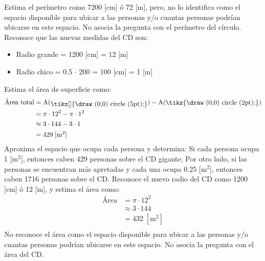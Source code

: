 \documentclass{cdplf-pauta}
\begin{document}
\begin{multicols}{3}
Estima el perímetro como 7200 [cm] ó 72 [m], pero, no lo identifica 
como el espacio disponible para ubicar a las personas y/o cuantas
personas podrían ubicarse en este espacio.
\insuficiente
[0 puntos] No asocia la pregunta con el perímetro del círculo.
\pregunta
\destacado
[4-5 puntos] Reconoce que las nuevas medidas del CD son:
\begin{itemize}[nosep,label=\textbullet]
    \item Radio grande = 1200 [cm] = 12 [m]
    \item Radio chico = 0.5 $\cdot$ 200 = 100 [cm] = 1 [m]
\end{itemize}
Estima el área de superficie como:
\setlength{\belowdisplayskip}{0pt}
\setlength{\belowdisplayshortskip}{0pt}
\begin{align*}
    \textrm{Área total} &= \mathrm{A}(\raisebox{-2.5pt}{\tikz[]{\draw (0,0) circle (5pt);}}) - \mathrm{A}(\raisebox{-0.5pt}{\tikz{\draw (0,0) circle (2pt);}}) \\
                        &= \pi\cdot 12^2 - \pi\cdot 1^2 \\
                        &\approx 3\cdot 144 - 3\cdot 1 \\
                        &= 429 \; [\textrm{m}^2] \\
\end{align*}
Aproxima el espacio que ocupa cada persona y determina: Si cada persona ocupa 1 [$\textrm{m}^2$], entonces caben 
429 personas sobre el CD gigante; Por otro lado, si las personas se encuentran más apretadas y cada una ocupa
0.25 [$\textrm{m}^2$], entonces caben 1716 personas sobre el CD.
\competente
[1-3 puntos] Reconoce el nuevo radio del CD como 1200 [cm] ó 12 [m], y 
estima el área como:
\setlength{\belowdisplayskip}{0pt}
\setlength{\belowdisplayshortskip}{0pt}
\begin{align*}
    \textrm{Área}       &=  \pi\cdot 12^2\\
                        &\approx 3\cdot 144\\
                        &= 432 \; [\textrm{m}^2] \\
\end{align*}
No reconoce el área como el espacio disponible para ubicar 
a las personas y/o cuantas personas podrían ubicarse en este 
espacio.
\insuficiente
[0 puntos] No asocia la pregunta con el área del CD.

\end{multicols}

\Large\vspace*{2cm}\hspace*{\fill}
\Caja[Puntaje][0.2\textwidth][40pt]
\Caja[Nota][0.2\textwidth][40pt]
\end{document}

